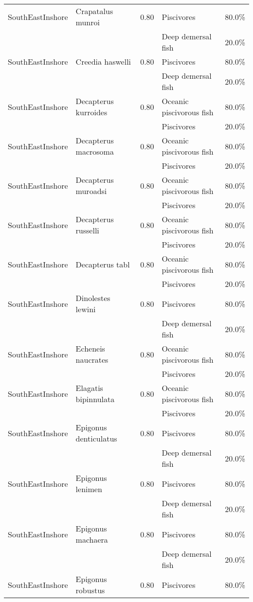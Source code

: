 \begin{longtable}{llcll}
SouthEastInshore & Crapatalus munroi & 0.80 & Piscivores & 80.0\% \\
& & & Deep demersal fish & 20.0\% \\
\hline
SouthEastInshore & Creedia haswelli & 0.80 & Piscivores & 80.0\% \\
& & & Deep demersal fish & 20.0\% \\
\hline
SouthEastInshore & Decapterus kurroides & 0.80 & Oceanic piscivorous fish & 80.0\% \\
& & & Piscivores & 20.0\% \\
\hline
SouthEastInshore & Decapterus macrosoma & 0.80 & Oceanic piscivorous fish & 80.0\% \\
& & & Piscivores & 20.0\% \\
\hline
SouthEastInshore & Decapterus muroadsi & 0.80 & Oceanic piscivorous fish & 80.0\% \\
& & & Piscivores & 20.0\% \\
\hline
SouthEastInshore & Decapterus russelli & 0.80 & Oceanic piscivorous fish & 80.0\% \\
& & & Piscivores & 20.0\% \\
\hline
SouthEastInshore & Decapterus tabl & 0.80 & Oceanic piscivorous fish & 80.0\% \\
& & & Piscivores & 20.0\% \\
\hline
SouthEastInshore & Dinolestes lewini & 0.80 & Piscivores & 80.0\% \\
& & & Deep demersal fish & 20.0\% \\
\hline
SouthEastInshore & Echeneis naucrates & 0.80 & Oceanic piscivorous fish & 80.0\% \\
& & & Piscivores & 20.0\% \\
\hline
SouthEastInshore & Elagatis bipinnulata & 0.80 & Oceanic piscivorous fish & 80.0\% \\
& & & Piscivores & 20.0\% \\
\hline
SouthEastInshore & Epigonus denticulatus & 0.80 & Piscivores & 80.0\% \\
& & & Deep demersal fish & 20.0\% \\
\hline
SouthEastInshore & Epigonus lenimen & 0.80 & Piscivores & 80.0\% \\
& & & Deep demersal fish & 20.0\% \\
\hline
SouthEastInshore & Epigonus machaera & 0.80 & Piscivores & 80.0\% \\
& & & Deep demersal fish & 20.0\% \\
\hline
SouthEastInshore & Epigonus robustus & 0.80 & Piscivores & 80.0\% \\

\end{longtable}
